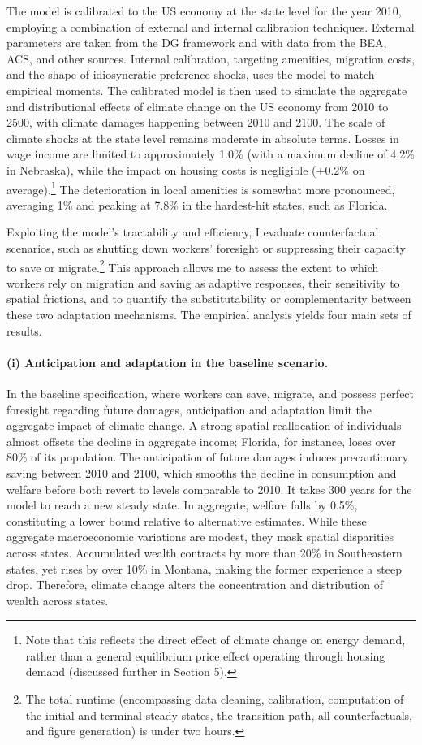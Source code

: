 \documentclass[12pt, a4paper]{article}
\begin{document}
The model is calibrated to the US economy at the state level for the year 2010, employing a combination of external and internal calibration techniques. External parameters are taken from the DG framework and with data from the BEA, ACS, and other sources. Internal calibration, targeting amenities, migration costs, and the shape of idiosyncratic preference shocks, uses the model to match empirical moments. The calibrated model is then used to simulate the aggregate and distributional effects of climate change on the US economy from 2010 to 2500, with climate damages happening between 2010 and 2100. The scale of climate shocks at the state level remains moderate in absolute terms. Losses in wage income are limited to approximately 1.0\% (with a maximum decline of 4.2\% in Nebraska), while the impact on housing costs is negligible ($+0.2$\% on average).\footnote{Note that this reflects the direct effect of climate change on energy demand, rather than a general equilibrium price effect operating through housing demand (discussed further in Section 5).} The deterioration in local amenities is somewhat more pronounced, averaging 1\% and peaking at 7.8\% in the hardest-hit states, such as Florida.

Exploiting the model's tractability and efficiency, I evaluate counterfactual scenarios, such as shutting down workers' foresight or suppressing their capacity to save or migrate.\footnote{The total runtime (encompassing data cleaning, calibration, computation of the initial and terminal steady states, the transition path, all counterfactuals, and figure generation) is under two hours.} This approach allows me to assess the extent to which workers rely on migration and saving as adaptive responses, their sensitivity to spatial frictions, and to quantify the substitutability or complementarity between these two adaptation mechanisms. The empirical analysis yields four main sets of results.

\paragraph{(i) Anticipation and adaptation in the baseline scenario.} In the baseline specification, where workers can save, migrate, and possess perfect foresight regarding future damages, anticipation and adaptation limit the aggregate impact of climate change. A strong spatial reallocation of individuals almost offsets the decline in aggregate income; Florida, for instance, loses over 80\% of its population. The anticipation of future damages induces precautionary saving between 2010 and 2100, which smooths the decline in consumption and welfare before both revert to levels comparable to 2010. It takes 300 years for the model to reach a new steady state. In aggregate, welfare falls by 0.5\%, constituting a lower bound relative to alternative estimates. While these aggregate macroeconomic variations are modest, they mask spatial disparities across states. Accumulated wealth contracts by more than 20\% in Southeastern states, yet rises by over 10\% in Montana, making the former experience a steep drop. Therefore, climate change alters the concentration and distribution of wealth across states.
\end{document}
